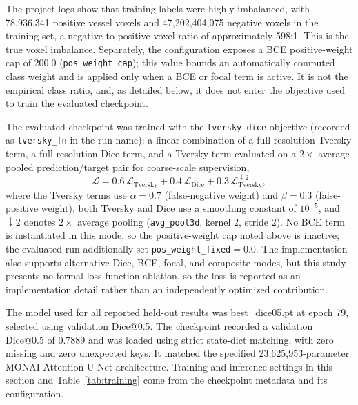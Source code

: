 \documentclass[anonymous]{iopjournal}
\begin{document}
The project logs show that training labels were highly imbalanced, with 78,936,341 positive vessel voxels and 47,202,404,075 negative voxels in the training set, a negative-to-positive voxel ratio of approximately 598:1. This is the true voxel imbalance. Separately, the configuration exposes a BCE positive-weight cap of 200.0 (\texttt{pos\_weight\_cap}); this value bounds an automatically computed class weight and is applied only when a BCE or focal term is active. It is not the empirical class ratio, and, as detailed below, it does not enter the objective used to train the evaluated checkpoint.

The evaluated checkpoint was trained with the \texttt{tversky\_dice} objective (recorded as \texttt{tversky\_fn} in the run name): a linear combination of a full-resolution Tversky term, a full-resolution Dice term, and a Tversky term evaluated on a $2\times$ average-pooled prediction/target pair for coarse-scale supervision, \begin{equation} \mathcal{L} = 0.6\,\mathcal{L}_{\mathrm{Tversky}} + 0.4\,\mathcal{L}_{\mathrm{Dice}} + 0.3\,\mathcal{L}_{\mathrm{Tversky}}^{\downarrow 2}, \label{eq:loss} \end{equation} where the Tversky terms use $\alpha=0.7$ (false-negative weight) and $\beta=0.3$ (false-positive weight), both Tversky and Dice use a smoothing constant of $10^{-5}$, and $\downarrow 2$ denotes $2\times$ average pooling (\texttt{avg\_pool3d}, kernel $2$, stride $2$). No BCE term is instantiated in this mode, so the positive-weight cap noted above is inactive; the evaluated run additionally set \texttt{pos\_weight\_fixed}${=}0.0$. The implementation also supports alternative Dice, BCE, focal, and composite modes, but this study presents no formal loss-function ablation, so the loss is reported as an implementation detail rather than an independently optimized contribution.

The model used for all reported held-out results was best\_dice05.pt at epoch 79, selected using validation Dice@0.5. The checkpoint recorded a validation Dice@0.5 of 0.7889 and was loaded using strict state-dict matching, with zero missing and zero unexpected keys. It matched the specified 23,625,953-parameter MONAI Attention U-Net architecture. Training and inference settings in this section and Table~\ref{tab:training} come from the checkpoint metadata and its configuration.
\end{document}
